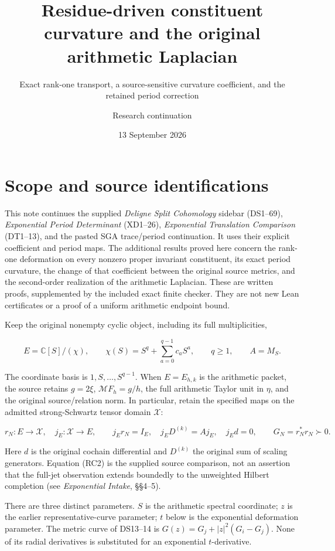 \documentclass[
  11pt,
]{article}
\title{Residue-driven constituent curvature and the original arithmetic
Laplacian}
\subtitle{Exact rank-one transport, a source-sensitive curvature
coefficient, and the retained period correction}
\author{Research continuation}
\date{13 September 2026}
\begin{document}
\maketitle

\section{Scope and source
identifications}\label{scope-and-source-identifications}

This note continues the supplied \emph{Deligne Split Cohomology} sidebar
(DS1--69), \emph{Exponential Period Determinant} (XD1--26),
\emph{Exponential Translation Comparison} (DT1--13), and the pasted SGA
trace/period continuation. It uses their explicit coefficient and period
maps. The additional results proved here concern the rank-one
deformation on every nonzero proper invariant constituent, its exact
period curvature, the change of that coefficient between the original
source metrics, and the second-order realization of the arithmetic
Laplacian. These are written proofs, supplemented by the included exact
finite checker. They are not new Lean certificates or a proof of a
uniform arithmetic endpoint bound.

Keep the original nonempty cyclic object, including its full
multiplicities,

\[
E=\mathbb C[S]/(\chi),\qquad
\chi(S)=S^q+\sum_{a=0}^{q-1}c_aS^a,\qquad q\geq1,
\qquad A=M_S.
\tag{RC1}
\]

The coordinate basis is \(1,S,\ldots,S^{q-1}\). When \(E=E_{h,k}\) is
the arithmetic packet, the source retains \(g=2\xi\),
\(\mathcal MF_h=g/h\), the full arithmetic Taylor unit in \(\eta\), and
the original source/relation norm. In particular, retain the specified
maps on the admitted strong-Schwartz tensor domain \(\mathscr X\):

\[
r_N:E\longrightarrow\mathscr X,\quad j_E:\mathscr X\longrightarrow E,
\qquad j_Er_N=I_E,\quad j_ED^{(k)}=Aj_E,\quad j_Ed=0,
\qquad G_N=r_N^*r_N\succ0.
\tag{RC2}
\]

Here \(d\) is the original cochain differential and \(D^{(k)}\) the
original sum of scaling generators. Equation (RC2) is the supplied
source comparison, not an assertion that the full-jet observation
extends boundedly to the unweighted Hilbert completion (see
\emph{Exponential Intake}, §§4--5).

There are three distinct parameters. \(S\) is the arithmetic spectral
coordinate; \(z\) is the earlier representative-curve parameter; \(t\)
below is the exponential deformation parameter. The metric curve of
DS13--14 is \(G(z)=G_j+|z|^2(G_i-G_j)\). None of its radial derivatives
is substituted for an exponential \(t\)-derivative.
\end{document}
